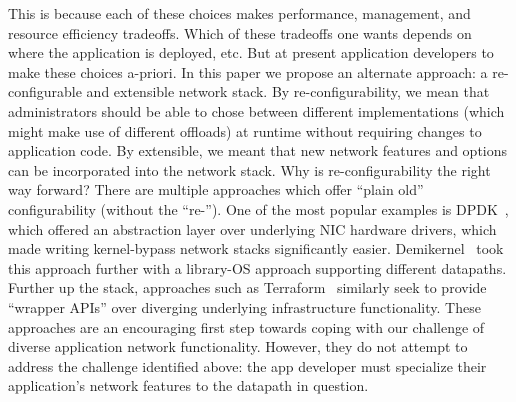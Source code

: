 \begin{outline}
    \1 This is because each of these choices makes performance, management, and resource efficiency tradeoffs. 
    \1 Which of these tradeoffs one wants depends on where the application is deployed, etc. But at present application developers to make these choices a-priori.
\0 In this paper we propose an alternate approach: a re-configurable and extensible network stack. 
 \1 By re-configurability, we mean that administrators should be able to chose between different implementations (which might make use of different offloads) at runtime without requiring changes to  application code.
 \1 By extensible, we meant that new network features and options can be incorporated into the network stack.
\0 Why is re-configurability the right way forward? 
  \1 There are multiple approaches which offer ``plain old'' configurability (without the ``re-''). One of the most popular examples is DPDK~\cite{dpdk}, which offered an abstraction layer over underlying NIC hardware drivers, which made writing kernel-bypass network stacks significantly easier. Demikernel~\cite{demikernel} took this approach further with a library-OS approach supporting different datapaths.
    \2 Further up the stack, approaches such as Terraform~\cite{terraform} similarly seek to provide ``wrapper APIs'' over diverging underlying infrastructure functionality. 
  \1 These approaches are an encouraging first step towards coping with our challenge of diverse application network functionality. However, they do not attempt to address the challenge identified above: the app developer must specialize their application's network features to the datapath in question.

\end{outline}

